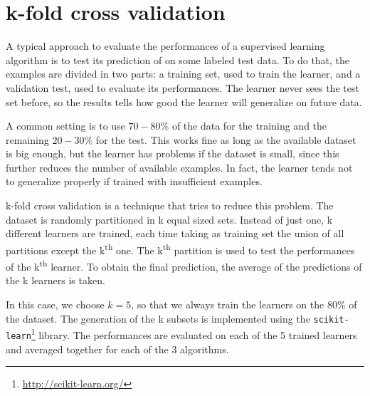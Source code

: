 \section{k-fold cross validation}
\label{sec:cross-validation}

A typical approach to evaluate the performances of a supervised learning algorithm is to test its prediction of on some labeled test data.
To do that, the examples are divided in two parts: a training set, used to train the learner, and a validation test, used to evaluate its performances.
The learner never sees the test set before, so the results tells how good the learner will generalize on future data.

A common setting is to use $70 - 80\%$ of the data for the training and the remaining $20 - 30\%$ for the test.
This works fine as long as the available dataset is big enough, but the learner has problems if the dataset is small, since this further reduces the number of available examples.
In fact, the learner tends not to generalize properly if trained with insufficient examples.

k-fold cross validation is a technique that tries to reduce this problem.
The dataset is randomly partitioned in k equal sized sets.
Instead of just one, k different learners are trained, each time taking as training set the union of all partitions except the k\textsuperscript{th} one.
The k\textsuperscript{th} partition is used to test the performances of the k\textsuperscript{th} learner.
To obtain the final prediction, the average of the predictions of the k learners is taken.

In this case, we choose $k = 5$, so that we always train the learners on the $80\%$ of the dataset.
The generation of the k subsets is implemented using the \texttt{scikit-learn}\footnote{\url{http://scikit-learn.org/}} library.
The performances are evaluated on each of the \num{5} trained learners and averaged together for each of the \num{3} algorithms.
